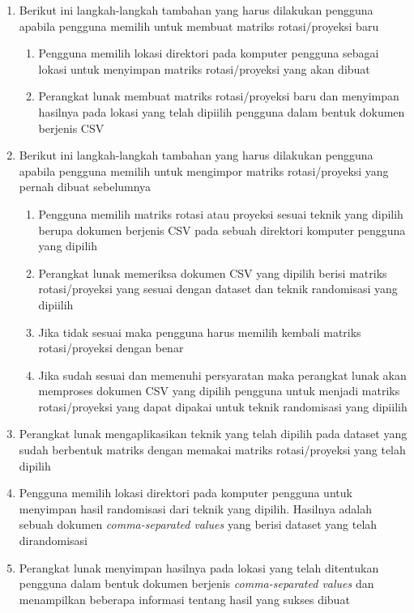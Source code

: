 \begin{enumerate}
    \item Berikut ini langkah-langkah tambahan yang harus dilakukan pengguna apabila pengguna memilih untuk membuat matriks rotasi/proyeksi baru
    \begin{enumerate}
        \item Pengguna memilih lokasi direktori pada komputer pengguna sebagai lokasi untuk menyimpan matriks rotasi/proyeksi yang akan dibuat
        \item Perangkat lunak membuat matriks rotasi/proyeksi baru dan menyimpan hasilnya pada lokasi yang telah dipiilih pengguna dalam bentuk dokumen berjenis CSV
    \end{enumerate}
    \item Berikut ini langkah-langkah tambahan yang harus dilakukan pengguna apabila pengguna memilih untuk mengimpor matriks rotasi/proyeksi yang pernah dibuat sebelumnya
    \begin{enumerate}
        \item Pengguna memilih matriks rotasi atau proyeksi sesuai teknik yang dipilih berupa dokumen berjenis CSV pada sebuah direktori komputer pengguna yang dipilih
        \item Perangkat lunak memeriksa dokumen CSV yang dipilih berisi matriks rotasi/proyeksi yang sesuai dengan dataset dan teknik randomisasi yang dipiilih
        \item Jika tidak sesuai maka pengguna harus memilih kembali matriks rotasi/proyeksi dengan benar
        \item Jika sudah sesuai dan memenuhi persyaratan maka perangkat lunak akan memproses dokumen CSV yang dipilih pengguna untuk menjadi matriks rotasi/proyeksi yang dapat dipakai untuk teknik randomisasi yang dipiilih
    \end{enumerate}
    \item Perangkat lunak mengaplikasikan teknik yang telah dipilih pada dataset yang sudah berbentuk matriks dengan memakai matriks rotasi/proyeksi yang telah dipilih
    \item Pengguna memilih lokasi direktori pada komputer pengguna untuk menyimpan hasil randomisasi dari teknik yang dipilih. Hasilnya adalah sebuah dokumen \textit{comma-separated values} yang berisi dataset yang telah dirandomisasi
    \item Perangkat lunak menyimpan hasilnya pada lokasi yang telah ditentukan pengguna dalam bentuk dokumen berjenis \textit{comma-separated values} dan menampilkan beberapa informasi tentang hasil yang sukses dibuat
\end{enumerate}

